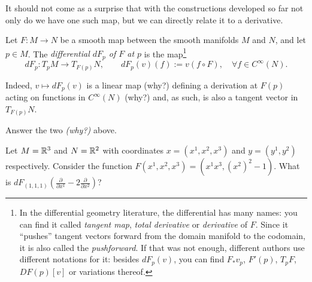 It should not come as a surprise that with the constructions developed so far not only do we have one such map, but we can directly relate it to a derivative.

\begin{definition}\label{def:differentialMap}
	Let $F: M \to N$ be a smooth map between the smooth manifolds $M$ and $N$, and let $p\in M$.
	The \emph{differential $d F_p$ of $F$ at $p$} is the map\footnote{In the differential geometry literature, the differential has many names: you can find it called \emph{tangent map}, \emph{total derivative} or \emph{derivative} of $F$.
		Since it ``pushes'' tangent vectors forward from the domain manifold to the codomain, it is also called the \emph{pushforward}. If that was not enough, different authors use different notations for it: besides $dF_p(v)$, you can find $F_* v_p$, $F'(p)$, $T_pF$, $DF(p)[v]$ or variations thereof.}
	\begin{equation}
		d F_p : T_p M \to T_{F(p)} N, \qquad d F_p (v) (f) := v(f\circ F), \quad \forall f\in C^\infty(N).
	\end{equation}
\end{definition}

Indeed, $v \mapsto d F_p (v)$ is a linear map (why?) defining a derivation at $F(p)$ acting on functions in $C^\infty(N)$ (why?) and, as such, is also a tangent vector in $T_{F(p)}N$.

\begin{exercise}
	Answer the two \emph{(why?)} above.
\end{exercise}

\begin{exercise}
	Let $M = \mathbb{R}^3$ and $N = \mathbb{R}^2$ with coordinates $x=(x^1,x^2,x^3)$ and $y=(y^1,y^2)$ respectively.
	Consider the function $F(x^1,x^2,x^3) = (x^1 x^3, (x^2)^2-1)$.
	What is $d F_{(1,1,1)} \left(\frac{\partial}{\partial x^1} - 2 \frac{\partial}{\partial x^2}\right)$?
\end{exercise}

